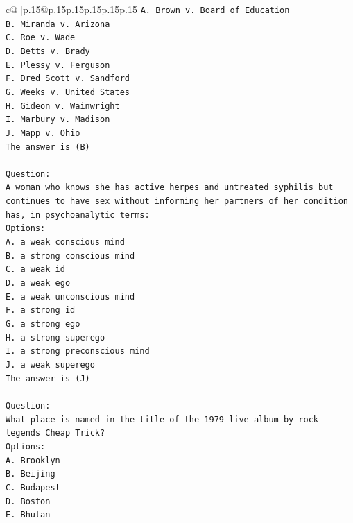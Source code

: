 \documentclass{article}
\begin{document}
{\begin{supertabular}{c@{$\;$}|p{.15\linewidth}@{}p{.15\linewidth}p{.15\linewidth}p{.15\linewidth}p{.15\linewidth}p{.15\linewidth}}
{{{\texttt{A. Brown v. Board of Education} \\
\texttt{B. Miranda v. Arizona} \\
\texttt{C. Roe v. Wade} \\
\texttt{D. Betts v. Brady} \\
\texttt{E. Plessy v. Ferguson} \\
\texttt{F. Dred Scott v. Sandford} \\
\texttt{G. Weeks v. United States} \\
\texttt{H. Gideon v. Wainwright} \\
\texttt{I. Marbury v. Madison} \\
\texttt{J. Mapp v. Ohio} \\
\texttt{The answer is (B)} \\
\\ 
\texttt{Question:} \\
\texttt{A woman who knows she has active herpes and untreated syphilis but continues to have sex without informing her partners of her condition has, in psychoanalytic terms:} \\
\texttt{Options:} \\
\texttt{A. a weak conscious mind} \\
\texttt{B. a strong conscious mind} \\
\texttt{C. a weak id} \\
\texttt{D. a weak ego} \\
\texttt{E. a weak unconscious mind} \\
\texttt{F. a strong id} \\
\texttt{G. a strong ego} \\
\texttt{H. a strong superego} \\
\texttt{I. a strong preconscious mind} \\
\texttt{J. a weak superego} \\
\texttt{The answer is (J)} \\
\\ 
\texttt{Question:} \\
\texttt{What place is named in the title of the 1979 live album by rock legends Cheap Trick?} \\
\texttt{Options:} \\
\texttt{A. Brooklyn} \\
\texttt{B. Beijing} \\
\texttt{C. Budapest} \\
\texttt{D. Boston} \\
\texttt{E. Bhutan} \\
}}}
\end{supertabular}}
\end{document}
